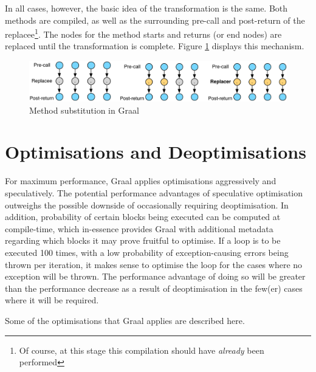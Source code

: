 In all cases, however, the basic idea of the transformation is the same. Both methods are compiled, as well as the surrounding pre-call and post-return of the replacee\footnote{Of course, at this stage this compilation should have \emph{already} been performed}. The nodes for the method starts and returns (or end nodes) are replaced until the transformation is complete. Figure \ref{fig:method-subs} displays this mechanism.

\begin{figure}
	\centering
	\includegraphics[width=\textwidth]{graphics/graph-replacement.pdf}
	\caption{Method substitution in Graal}
	\label{fig:method-subs}
\end{figure}

\section{Optimisations and Deoptimisations} \label{sec:graal/deopt}
For maximum performance, Graal applies optimisations aggressively and speculatively. The potential performance advantages of speculative optimisation outweighs the possible downside of occasionally requiring deoptimisation. In addition, probability of certain blocks being executed can be computed at compile-time, which in-essence provides Graal with additional metadata regarding which blocks it may prove fruitful to optimise. If a loop is to be executed 100 times, with a low probability of exception-causing errors being thrown per iteration, it makes sense to optimise the loop for the cases where no exception will be thrown. The performance advantage of doing so will be greater than the performance decrease as a result of deoptimisation in the few(er) cases where it will be required.

Some of the optimisations that Graal applies are described here.

